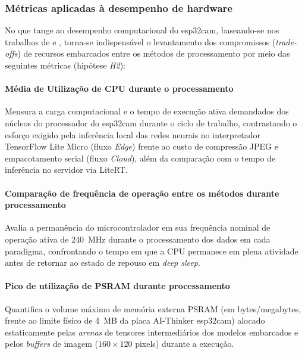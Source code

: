 \subsubsection{Métricas aplicadas à desempenho de hardware}
\label{subsubsec:metricas_hardware}

No que tange ao desempenho computacional do \gls{esp32cam}, baseando-se nos
trabalhos de  e , torna-se
indispensável o levantamento dos compromissos (\textit{trade-offs}) de recursos
embarcados entre os métodos de processamento por meio das seguintes métricas
(hipótese \textit{H2}):

\paragraph{Média de Utilização de CPU durante o processamento}
Mensura a carga computacional e o tempo de execução ativa demandados dos
núcleos do processador do \gls{esp32cam} durante o ciclo de trabalho,
contrastando o esforço exigido pela inferência local das redes neurais no
interpretador TensorFlow Lite Micro (fluxo \textit{Edge}) frente ao custo de
compressão JPEG e empacotamento serial (fluxo \textit{Cloud}), além da
comparação com o tempo de inferência no servidor via LiteRT.

\paragraph{Comparação de frequência de operação entre os métodos durante processamento}
Avalia a permanência do microcontrolador em sua frequência nominal de operação
ativa de 240~MHz durante o processamento dos dados em cada paradigma,
confrontando o tempo em que a CPU permanece em plena atividade antes de
retornar ao estado de repouso em \textit{deep sleep}.

\paragraph{Pico de utilização de PSRAM durante processamento}
Quantifica o volume máximo de memória externa PSRAM (em bytes/megabytes, frente
ao limite físico de 4~MB da placa AI-Thinker \gls{esp32cam}) alocado
estaticamente pelas \textit{arenas} de tensores intermediários dos modelos
embarcados e pelos \textit{buffers} de imagem ($160 \times 120$ pixels)
durante a execução.